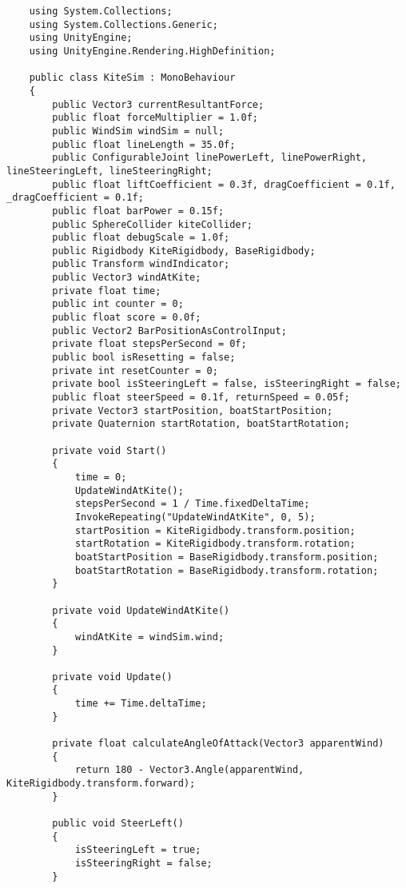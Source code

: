\begin{lstlisting}
    using System.Collections;
    using System.Collections.Generic;
    using UnityEngine;
    using UnityEngine.Rendering.HighDefinition;
    
    public class KiteSim : MonoBehaviour
    {
        public Vector3 currentResultantForce;
        public float forceMultiplier = 1.0f;
        public WindSim windSim = null;
        public float lineLength = 35.0f;
        public ConfigurableJoint linePowerLeft, linePowerRight, lineSteeringLeft, lineSteeringRight;
        public float liftCoefficient = 0.3f, dragCoefficient = 0.1f, _dragCoefficient = 0.1f;
        public float barPower = 0.15f;
        public SphereCollider kiteCollider;
        public float debugScale = 1.0f;
        public Rigidbody KiteRigidbody, BaseRigidbody;
        public Transform windIndicator;
        public Vector3 windAtKite;
        private float time;
        public int counter = 0;
        public float score = 0.0f;
        public Vector2 BarPositionAsControlInput;
        private float stepsPerSecond = 0f;
        public bool isResetting = false;
        private int resetCounter = 0;
        private bool isSteeringLeft = false, isSteeringRight = false;
        public float steerSpeed = 0.1f, returnSpeed = 0.05f;
        private Vector3 startPosition, boatStartPosition;
        private Quaternion startRotation, boatStartRotation;
    
        private void Start()
        {
            time = 0;
            UpdateWindAtKite();
            stepsPerSecond = 1 / Time.fixedDeltaTime;
            InvokeRepeating("UpdateWindAtKite", 0, 5);
            startPosition = KiteRigidbody.transform.position;
            startRotation = KiteRigidbody.transform.rotation;
            boatStartPosition = BaseRigidbody.transform.position;
            boatStartRotation = BaseRigidbody.transform.rotation;
        }
    
        private void UpdateWindAtKite()
        {
            windAtKite = windSim.wind;
        }
    
        private void Update()
        {
            time += Time.deltaTime;
        }
    
        private float calculateAngleOfAttack(Vector3 apparentWind)
        {
            return 180 - Vector3.Angle(apparentWind, KiteRigidbody.transform.forward);
        }
    
        public void SteerLeft()
        {
            isSteeringLeft = true;
            isSteeringRight = false;
        }
    

\end{lstlisting}
